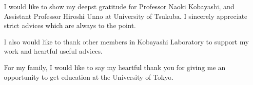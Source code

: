 \begin{acknowledge}
I would like to show my deepst gratitude for Professor Naoki
Kobayashi, and Assistant Professor Hiroshi Unno at University of
Tsukuba.  I sincerely appreciate strict advices which are always to
the point.

I also would like to thank other members in Kobayashi Laboratory to
support my work and heartful useful advices.

For my family, I would like to say my heartful thank you for giving me
an opportunity to get education at the University of Tokyo.
\end{acknowledge}
